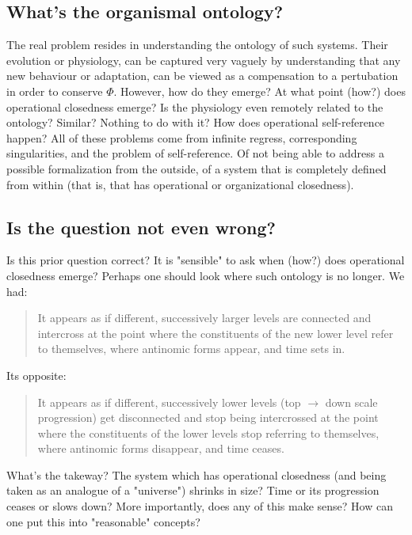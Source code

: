 \documentclass[a4paper,12pt,twoside,leqno]{article}
\begin{document}
\subsection*{What's the organismal ontology?}
The real problem resides in understanding the ontology of such systems. Their evolution or physiology, can be captured very vaguely by understanding that any new behaviour or adaptation, can be viewed as a compensation to a pertubation in order to conserve $\Phi$. However, how do they emerge? At what point (how?) does operational closedness emerge? Is the physiology even remotely related to the ontology? Similar? Nothing to do with it? How does operational self-reference happen? All of these problems come from infinite regress, corresponding singularities, and the problem of self-reference. Of not being able to address a possible formalization from the outside, of a system that is completely defined from within (that is, that has operational or organizational closedness).
\subsection*{Is the question not even wrong?}
Is this prior question correct? It is "sensible" to ask when (how?) does operational closedness emerge? Perhaps one should look where such ontology is no longer. We had:
\begin{quotation}
It appears as if different, successively larger levels are connected and intercross at the point where the constituents of the new lower level refer to themselves, where antinomic forms appear, and time sets in.
\end{quotation}
Its opposite:
\begin{quotation}
It appears as if different, successively lower levels (top $\rightarrow$ down scale progression) get disconnected and stop being intercrossed at the point where the constituents of the lower levels stop referring to themselves, where antinomic forms disappear, and time ceases.
\end{quotation}
What's the takeway? The system which has operational closedness (and being taken as an analogue of a "universe") shrinks in size? Time or its progression ceases or slows down? More importantly, does any of this make sense? How can one put this into "reasonable" concepts?
\end{document}
